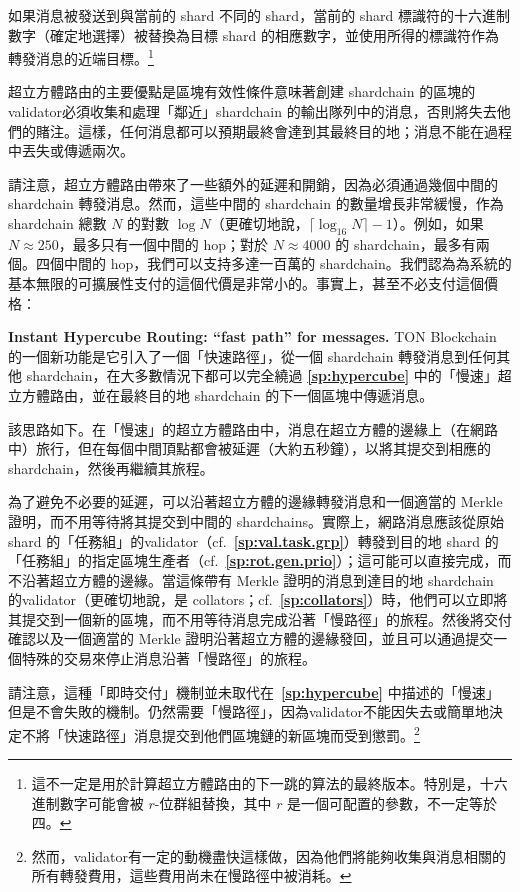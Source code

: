 \documentclass[12pt,oneside]{article}
\def\makepoint#1{\medbreak\noindent{\bf #1.\ }}
\def\nxsubpoint{\refstepcounter{subsubsection}%
  \smallbreak\makepoint{\thesubsubsection}}
\def\refpoint#1{{\rm\textbf{\ref{#1}}}}
\let\ptref=\refpoint
\def\embt(#1.){\textbf{#1.}}
\begin{document}
如果消息被發送到與當前的 shard 不同的 shard，當前的 shard 標識符的十六進制數字（確定地選擇）被替換為目標 shard 的相應數字，並使用所得的標識符作為轉發消息的近端目標。\footnote{這不一定是用於計算超立方體路由的下一跳的算法的最終版本。特別是，十六進制數字可能會被 $r$-位群組替換，其中 $r$ 是一個可配置的參數，不一定等於四。}

超立方體路由的主要優點是區塊有效性條件意味著創建 shardchain 的區塊的validator必須收集和處理「鄰近」shardchain 的輸出隊列中的消息，否則將失去他們的賭注。這樣，任何消息都可以預期最終會達到其最終目的地；消息不能在過程中丟失或傳遞兩次。

請注意，超立方體路由帶來了一些額外的延遲和開銷，因為必須通過幾個中間的 shardchain 轉發消息。然而，這些中間的 shardchain 的數量增長非常緩慢，作為 shardchain 總數 $N$ 的對數 $\log N$（更確切地說，$\lceil\log_{16}N\rceil-1$）。例如，如果 $N\approx250$，最多只有一個中間的 hop；對於 $N\approx4000$ 的 shardchain，最多有兩個。四個中間的 hop，我們可以支持多達一百萬的 shardchain。我們認為為系統的基本無限的可擴展性支付的這個代價是非常小的。事實上，甚至不必支付這個價格：

\nxsubpoint\label{sp:instant.hypercube} \embt(Instant Hypercube
Routing: ``fast path'' for messages.) TON Blockchain 的一個新功能是它引入了一個「快速路徑」，從一個 shardchain 轉發消息到任何其他 shardchain，在大多數情況下都可以完全繞過 \ptref{sp:hypercube} 中的「慢速」超立方體路由，並在最終目的地 shardchain 的下一個區塊中傳遞消息。

該思路如下。在「慢速」的超立方體路由中，消息在超立方體的邊緣上（在網路中）旅行，但在每個中間頂點都會被延遲（大約五秒鐘），以將其提交到相應的 shardchain，然後再繼續其旅程。

為了避免不必要的延遲，可以沿著超立方體的邊緣轉發消息和一個適當的 Merkle 證明，而不用等待將其提交到中間的 shardchains。實際上，網路消息應該從原始 shard 的「任務組」的validator（cf.~\ptref{sp:val.task.grp}）轉發到目的地 shard 的「任務組」的指定區塊生產者（cf.~\ptref{sp:rot.gen.prio}）；這可能可以直接完成，而不沿著超立方體的邊緣。當這條帶有 Merkle 證明的消息到達目的地 shardchain 的validator（更確切地說，是 collators；cf.~\ptref{sp:collators}）時，他們可以立即將其提交到一個新的區塊，而不用等待消息完成沿著「慢路徑」的旅程。然後將交付確認以及一個適當的 Merkle 證明沿著超立方體的邊緣發回，並且可以通過提交一個特殊的交易來停止消息沿著「慢路徑」的旅程。

請注意，這種「即時交付」機制並未取代在~\ptref{sp:hypercube} 中描述的「慢速」但是不會失敗的機制。仍然需要「慢路徑」，因為validator不能因失去或簡單地決定不將「快速路徑」消息提交到他們區塊鏈的新區塊而受到懲罰。\footnote{然而，validator有一定的動機盡快這樣做，因為他們將能夠收集與消息相關的所有轉發費用，這些費用尚未在慢路徑中被消耗。}
\end{document}
